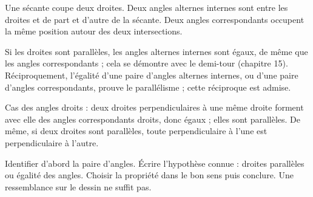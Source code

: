 \begin{definition}Une sécante coupe deux droites. Deux angles alternes internes sont entre les droites et de part et d’autre de la sécante. Deux angles correspondants occupent la même position autour des deux intersections.\end{definition}
\begin{propriete}Si les droites sont parallèles, les angles alternes internes sont égaux, de même que les angles correspondants ; cela se démontre avec le demi-tour (chapitre 15). Réciproquement, l’égalité d’une paire d’angles alternes internes, ou d’une paire d’angles correspondants, prouve le parallélisme ; cette réciproque est admise.\end{propriete}
\begin{exemple}Cas des angles droits : deux droites perpendiculaires à une même droite forment avec elle des angles correspondants droits, donc égaux ; elles sont parallèles. De même, si deux droites sont parallèles, toute perpendiculaire à l’une est perpendiculaire à l’autre.\end{exemple}
\begin{savoirfaire}Identifier d’abord la paire d’angles. Écrire l’hypothèse connue : droites parallèles ou égalité des angles. Choisir la propriété dans le bon sens puis conclure. Une ressemblance sur le dessin ne suffit pas.\end{savoirfaire}

